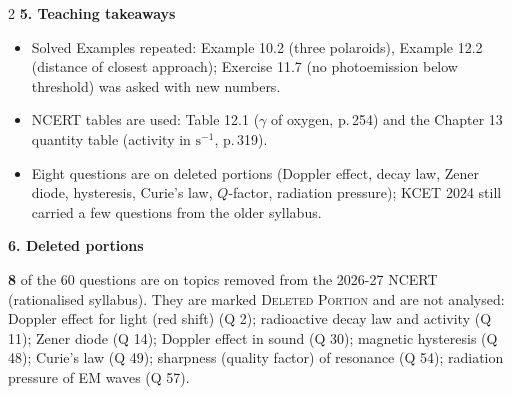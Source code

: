 \begin{multicols}{2}
\textbf{\color{crimson}5. Teaching takeaways}\par\smallskip
{\footnotesize\begin{itemize}[leftmargin=1em,nosep]
\item Solved Examples repeated: Example 10.2 (three polaroids), Example 12.2 (distance of closest approach); Exercise 11.7 (no photoemission below threshold) was asked with new numbers.
\item NCERT tables are used: Table 12.1 ($\gamma$ of oxygen, p.\,254) and the Chapter 13 quantity table (activity in $\mathrm{s^{-1}}$, p.\,319).
\item Eight questions are on deleted portions (Doppler effect, decay law, Zener diode, hysteresis, Curie's law, $Q$-factor, radiation pressure); KCET 2024 still carried a few questions from the older syllabus.
\end{itemize}}\par\medskip
\textbf{\color{crimson}6. Deleted portions}\par\smallskip
\textbf{8} of the 60 questions are on topics removed from the 2026-27 NCERT (rationalised syllabus). They are marked \textsc{Deleted Portion} and are not analysed: Doppler effect for light (red shift) (Q 2); radioactive decay law and activity (Q 11); Zener diode (Q 14); Doppler effect in sound (Q 30); magnetic hysteresis (Q 48); Curie's law (Q 49); sharpness (quality factor) of resonance (Q 54); radiation pressure of EM waves (Q 57).\par
\end{multicols}








